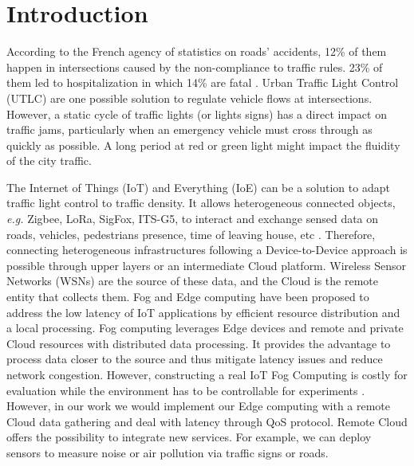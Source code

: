 \section{Introduction} \label{sec:Introduction}

According to the French agency of statistics on roads' accidents, 12\%  of them happen in intersections caused by the non-compliance to traffic rules. 23\% of them led to hospitalization in which 14\% are fatal \cite{Routiere2015}.
Urban Traffic Light Control (UTLC) are one possible solution to regulate vehicle flows at intersections.
However,
	a static cycle of traffic lights (or lights signs) has a direct impact on traffic jams,
	particularly when an emergency vehicle must cross through as quickly as possible.
A long period at red or green light might impact the fluidity of the city traffic.

The Internet of Things (IoT) and Everything (IoE) can be a solution to adapt traffic light control to traffic density.
It allows heterogeneous connected objects,
	\textit{e.g.} Zigbee,
	LoRa,
	SigFox,
	ITS-G5,
	to interact and exchange sensed data on roads,
	vehicles,
	pedestrians presence,
	time of leaving house,
	etc  \cite{Perera2014}.
Therefore,
	connecting heterogeneous infrastructures following a Device-to-Device approach is possible through upper layers or an intermediate Cloud platform.
Wireless Sensor Networks (WSNs) are the source of these data,
	and the Cloud is the remote entity that collects them.
Fog and Edge computing have been proposed to address the low latency of IoT applications by efficient resource distribution and a local processing.
Fog computing leverages Edge devices and remote and private Cloud resources with distributed data processing.
It provides the advantage to process data closer to the source and thus mitigate latency issues and reduce network congestion.
However,
	constructing a real IoT Fog Computing is costly for evaluation while the environment has to be controllable for experiments \cite{Dastjerdi2016}.
However,
	in our work we would implement our Edge computing with a remote Cloud data gathering and deal with latency through QoS protocol.
Remote Cloud offers the possibility to integrate new services.
For example,
	we can deploy sensors to measure noise or air pollution via traffic signs or roads.

